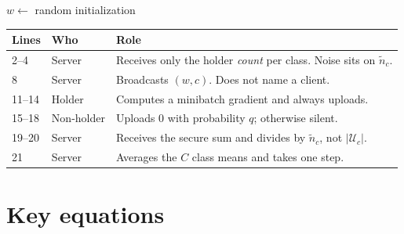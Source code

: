 \documentclass[11pt,a4paper]{article}
\theoremstyle{plain}
\begin{document}
\begin{algorithm}[H]
\DontPrintSemicolon
\caption{FedHBT}
$w \leftarrow$ random initialization\;
\BlankLine
{}
\BlankLine
{}
\end{algorithm}

\vspace{0.4em}
\noindent
\begin{tabular}{@{}llp{9.4cm}@{}}
\toprule
Lines & Who & Role \\
\midrule
2--4 & Server & Receives only the holder \emph{count} per class. Noise sits on $\tilde n_c$. \\
8 & Server & Broadcasts $(w,c)$. Does not name a client. \\
11--14 & Holder & Computes a minibatch gradient and always uploads. \\
15--18 & Non-holder & Uploads $0$ with probability $q$; otherwise silent. \\
19--20 & Server & Receives the secure sum and divides by $\tilde n_c$, not $|\mathcal{U}_c|$. \\
21 & Server & Averages the $C$ class means and takes one step. \\
\bottomrule
\end{tabular}

\section{Key equations}
\end{document}
